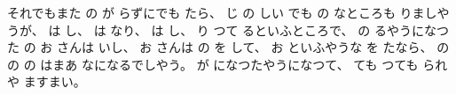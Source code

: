 それでもまた
の
が
らずにでも
たら、
%
じ
の
しい
でも
の
なところも
りましやうが、
%
は
し、
%
は
なり、
%
は
し、
%
り
つて
るといふところで、
%
の
るやうになつた
の
お
さんは
いし、
%
お
さんは
の
を
して、
%
お
といふやうな
を
たなら、
%
の
の
の
はまあ
なになるでしやう。
%
が
になつたやうになつて、
%
ても
つても
られや
ますまい。

